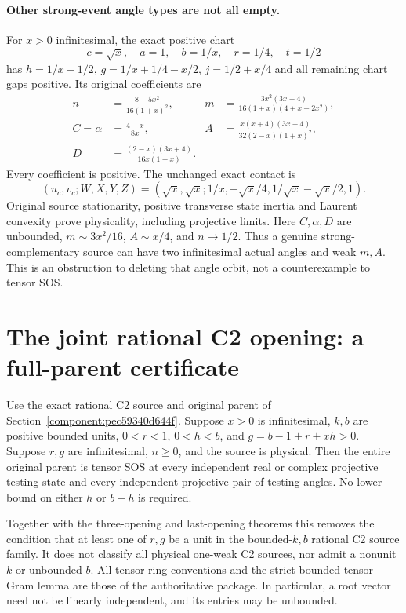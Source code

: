 \paragraph{Other strong-event angle types are not all empty.}
For $x>0$ infinitesimal, the exact positive chart
\[
 c=\sqrt x,\quad a=1,\quad b=1/x,\quad r=1/4,\quad t=1/2
\]
has $h=1/x-1/2$, $g=1/x+1/4-x/2$, $j=1/2+x/4$ and all
remaining chart gaps positive. Its original coefficients are
\begin{align*}
 n&=\frac{8-5x^2}{16(1+x)^2},&
 m&=\frac{3x^2(3x+4)}{16(1+x)(4+x-2x^2)},\\
 C=\alpha&=\frac{4-x}{8x},&
 A&=\frac{x(x+4)(3x+4)}{32(2-x)(1+x)^2},\\
 D&=\frac{(2-x)(3x+4)}{16x(1+x)}.
\end{align*}
Every coefficient is positive. The unchanged exact contact is
\[
 (u_c,v_c;W,X,Y,Z)
 =(\sqrt x,\sqrt x;1/x,-\sqrt x/4,1/\sqrt x-\sqrt x/2,1).
\]
Original source stationarity, positive transverse state inertia and
Laurent convexity prove physicality, including projective limits.
Here $C,\alpha,D$ are unbounded, $m\sim3x^2/16$, $A\sim x/4$,
and $n\to1/2$. Thus a genuine strong-complementary source can have
two infinitesimal actual angles and weak $m,A$. This is an obstruction
to deleting that angle orbit, not a counterexample to tensor SOS.


\section{\texorpdfstring{The joint rational C2 opening: a full-parent certificate}{The joint rational C2 opening: a full-parent certificate}}
\label{component:p8f912583feaa}

\label{p8f912583feaa:sec:c2-joint-centered}

\begin{theorem}
Use the exact rational C2 source and original parent of
Section~\ref{component:pec59340d644f}.  Suppose $x>0$ is infinitesimal,
$k,b$ are positive bounded units, $0<r<1$, $0<h<b$, and
$g=b-1+r+xh>0$.  Suppose $r,g$ are infinitesimal, $n\geq0$, and
the source is physical.  Then the entire original parent is tensor
SOS at every independent real or complex projective testing state
and every independent projective pair of testing angles.  No lower
bound on either $h$ or $b-h$ is required.
\end{theorem}

Together with the three-opening and last-opening theorems this
removes the condition that at least one of $r,g$ be a unit in the
bounded-$k,b$ rational C2 source family.  It does not classify all
physical one-weak C2 sources, nor admit a nonunit $k$ or unbounded $b$.
All tensor-ring conventions and the strict bounded tensor Gram lemma
are those of the authoritative package.  In particular, a root vector
need not be linearly independent, and its entries may be unbounded.

